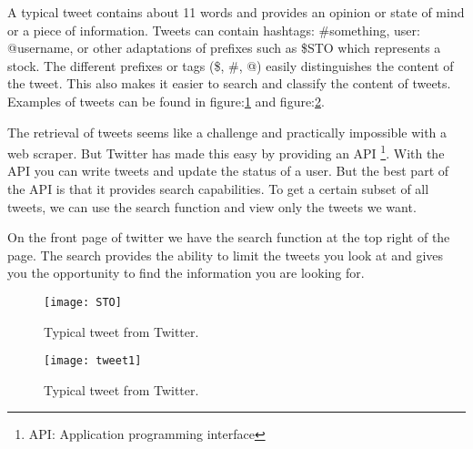 A typical tweet contains about 11 words and provides an opinion or state of
mind or a piece of information. Tweets can contain hashtags: #something, user:
@username, or other adaptations of prefixes such as \$STO which represents a
stock. The different prefixes or tags (\$, \#, @) easily distinguishes the
content of the tweet. This also makes it easier to search and classify the
content of tweets. Examples of tweets can be found in figure:\ref{fig:sto} and
figure:\ref{fig:tweet1}.

The retrieval of tweets seems like a challenge and practically impossible with
a web scraper. But Twitter has made this easy by providing an API
\footnote{API: Application programming interface}. With the API you can write
tweets and update the status of a user. But the best part of the API is that it
provides search capabilities. To get a certain subset of all tweets, we can use
the search function and view only the tweets we want. 

On the front page of twitter we have the search function at the top right of
the page. The search provides the ability to limit the tweets you look at and
gives you the opportunity to find the information you are looking for. 

\begin{figure}[htb]
    \centering
    \texttt{[image: STO]} 
    \caption{Typical tweet from Twitter.}
    \label{fig:sto}
\end{figure}


\begin{figure}[htb]
    \centering
    \texttt{[image: tweet1]} 
    \caption{Typical tweet from Twitter.}
    \label{fig:tweet1}
\end{figure}

%

